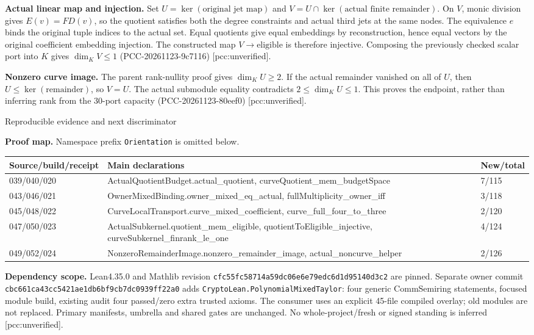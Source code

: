 \documentclass[10pt]{article}
\begin{document}
\textbf{Actual linear map and injection.}
Set $U=\ker(\text{original jet map})$ and
$V=U\cap\ker(\text{actual finite remainder})$.
On $V$, monic division gives $E(v)=FD(v)$, so the quotient satisfies
both the degree constraints and actual third jets at the same nodes.
The equivalence $e$ binds the original tuple indices to the actual set.
Equal quotients give equal embeddings by reconstruction, hence equal
vectors by the original coefficient embedding injection.
The constructed map $V\to\text{eligible}$ is therefore injective.
Composing the previously checked scalar port into $K$ gives
$\dim_KV\le1$ (PCC-20261123-9c7116) [pcc:unverified].

\textbf{Nonzero curve image.}
The parent rank-nullity proof gives $\dim_KU\ge2$.
If the actual remainder vanished on all of $U$, then
$U\le\ker(\text{remainder})$, so $V=U$.
The actual submodule equality contradicts $2\le\dim_KU\le1$.
This proves the endpoint, rather than inferring rank from the 30-port
capacity (PCC-20261123-80eef0) [pcc:unverified].
\newpage
\begin{center}{\Large Reproducible evidence and next discriminator}\end{center}
\textbf{Proof map.} Namespace prefix \texttt{Orientation} is omitted below.
\small
\begin{tabular}{p{.23\linewidth}p{.48\linewidth}p{.2\linewidth}}
Source/build/receipt & Main declarations & New/total\\\hline
039/040/020 & ActualQuotientBudget.actual\_quotient, curveQuotient\_mem\_budgetSpace &7/115\\
043/046/021 & OwnerMixedBinding.owner\_mixed\_eq\_actual, fullMultiplicity\_owner\_iff &3/118\\
045/048/022 & CurveLocalTransport.curve\_mixed\_coefficient, curve\_full\_four\_to\_three &2/120\\
047/050/023 & ActualSubkernel.quotient\_mem\_eligible, quotientToEligible\_injective, curveSubkernel\_finrank\_le\_one &4/124\\
049/052/024 & NonzeroRemainderImage.nonzero\_remainder\_image, actual\_noncurve\_helper &2/126
\end{tabular}
\normalsize

\textbf{Dependency scope.}
Lean4.35.0 and Mathlib revision
\texttt{cfc55fc58714a59dc06e6e79edc6d1d95140d3c2} are pinned.
Separate owner commit \texttt{cbc661ca43cc5421ae1db6bf9cb7dc0939ff22a0}
adds \texttt{CryptoLean.PolynomialMixedTaylor}: four generic CommSemiring
statements, focused module build, existing audit four passed/zero
extra trusted axioms. The consumer uses an explicit 45-file compiled
overlay; old modules are not replaced. Primary manifests, umbrella and
shared gates are unchanged. No whole-project/fresh or signed standing
is inferred [pcc:unverified].
\end{document}
